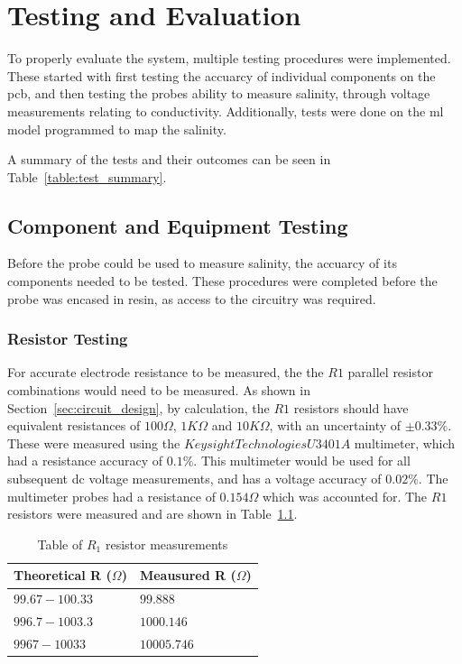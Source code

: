 \chapter{Testing and Evaluation}

To properly evaluate the system, multiple testing procedures were implemented.
These started with first testing the accuarcy of individual components on the \gls{pcb}, and then testing the probes ability to measure salinity, through voltage measurements relating to conductivity.
Additionally, tests were done on the \gls{ml} model programmed to map the salinity.

A summary of the tests and their outcomes can be seen in Table~\ref{table:test_summary}. %


\section{Component and Equipment Testing}
Before the probe could be used to measure salinity, the accuarcy of its components needed to be tested.
These procedures were completed before the probe was encased in resin, as access to the circuitry was required.

\subsection{Resistor Testing}
For accurate electrode resistance to be measured, the the $R1$ parallel resistor combinations would need to be measured.
As shown in Section~\ref{sec:circuit_design}, by calculation, the $R1$ resistors should have equivalent resistances of $100\Omega$, $1K\Omega$ and $10K\Omega$, with an uncertainty of $\pm0.33\%$.
These were measured using the $Keysight Technologies U3401A$ multimeter, which had a resistance accuracy of $0.1\%$.
This multimeter would be used for all subsequent \gls{dc} voltage measurements, and has a voltage accuracy of $0.02\%$.
The multimeter probes had a resistance of $0.154\Omega$ which was accounted for.
The $R1$ resistors were measured and are shown in Table~\ref{tabel:resistance_test}.


\begingroup
    \renewcommand{\arraystretch}{1.8} %
    \begin{table}[h!]
        \centering
            \begin{tabular}{|>{\centering\arraybackslash}p{5cm}|
                >{\centering\arraybackslash}m{5cm}|}
            \hline
            Theoretical R ($\Omega$) & Meausured R ($\Omega$) \\ \hline
            $99.67-100.33$ & $99.888$ \\ \hline
            $996.7-1003.3$ & $1000.146$ \\ \hline
            $9967-10033$ & $10005.746$ \\ \hline
            \end{tabular}
        \caption{Table of $R_1$ resistor measurements}
        \label{tabel:resistance_test}
    \end{table}
\endgroup

